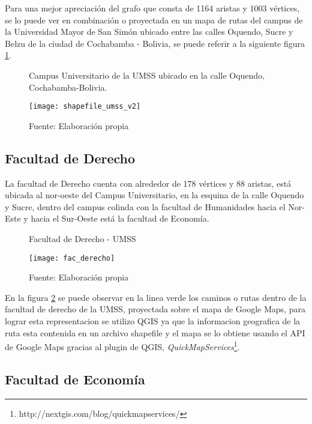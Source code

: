  Para una mejor apreciación del grafo que consta de 1164 aristas y 1003 vértices, se lo puede ver en combinación o proyectada en un mapa de rutas del campus de la Universidad Mayor de San Simón ubicado entre las calles Oquendo, Sucre y  Belzu de la ciudad de Cochabamba - Bolivia, se puede referir a la siguiente figura \ref{fig:shapefile_umss_v2}.

  \begin{figure}[H]
    \begin{center}
      \caption{Campus Universitario de la UMSS ubicado en la calle Oquendo, Cochabamba-Bolivia.}
      \label{fig:shapefile_umss_v2}
      \texttt{[image: shapefile\_umss\_v2]}
      \caption*{Fuente: Elaboración propia}
    \end{center}
  \end{figure}


  \subsection{Facultad de Derecho}
  \label{sub:facultad_derecho}

  La facultad de Derecho cuenta con alrededor de 178 vértices y 88 aristas, está ubicada al nor-oeste del Campus Universitario, en la esquina de la calle Oquendo y Sucre, dentro del campus colinda con la facultad de Humanidades hacia el Nor-Este y hacia el Sur-Oeste está la facultad de Economía.

  \begin{figure}[H]
    \begin{center}
      \caption{Facultad de Derecho - UMSS}
      \label{fig:fac_derecho}
      \texttt{[image: fac\_derecho]}
      \caption*{Fuente: Elaboración propia}
    \end{center}
  \end{figure}

  En la figura \ref{fig:fac_derecho} se puede observar en la linea verde los caminos o rutas dentro de la facultad de derecho de la UMSS, proyectada sobre el mapa de Google Maps, para lograr esta representacion se utilizo QGIS ya que la informacion geografica de la ruta esta contenida en un archivo shapefile y el mapa se lo obtiene usando el API de Google Maps gracias al plugin de QGIS, \emph{QuickMapServices}\footnote{http://nextgis.com/blog/quickmapservices/}.


\subsection{Facultad de Economía}
\label{sub:facultad_economia}

